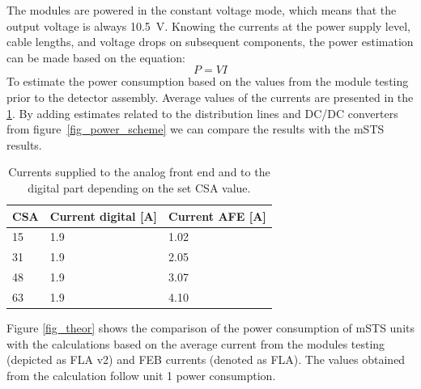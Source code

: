 The modules are powered in the constant voltage mode, which means that the output voltage is always 10.5~V. Knowing the currents at the power supply level, cable lengths, and voltage drops on subsequent components, the power estimation can be made based on the equation:
\begin{equation}
    P = VI
\end{equation}
To estimate the power consumption based on the values from the module testing prior to the detector assembly. Average values of the currents are presented in the \ref{tab:typical_cons}. By adding estimates related to the distribution lines and DC/DC converters from figure~\ref{fig_power_scheme} we can compare the results with the \gls{mSTS} results. 
\begin{table}[!h]
\caption{Currents supplied to the analog front end and to the digital part depending on the set \gls{CSA} value.}
\centering
\begin{tabular}{lll}
\hline
CSA & Current digital {[}A{]} & Current \gls{AFE} {[}A{]} \\ \hline
15  & 1.9                 & 1.02                    \\
31  & 1.9                 & 2.05                    \\
48  & 1.9                 & 3.07                    \\
63  & 1.9                 & 4.10                    \\ \hline
\end{tabular}

\label{tab:typical_cons}
\end{table}
\newpage
Figure \ref{fig_theor} shows the comparison of the power consumption of \gls{mSTS} units with the calculations based on the average current from the modules testing (depicted as FLA v2) and FEB currents (denoted as FLA). The values obtained from the calculation follow unit 1 power consumption. 

